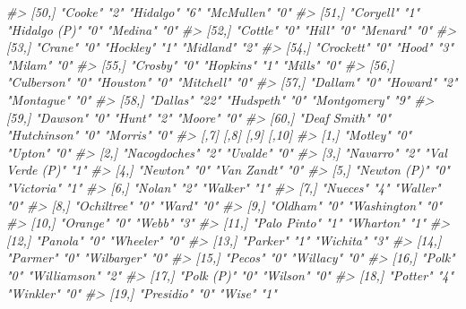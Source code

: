 \documentclass[
  12pt,
]{book}
\newenvironment{Shaded}{\begin{snugshade}}{\end{snugshade}}
\newcommand{\CommentTok}[1]{\textcolor[rgb]{0.37,0.37,0.37}{\textit{#1}}}
\begin{document}
\begin{Shaded}
\begin{Highlighting}[]
\CommentTok{\#\textgreater{} [50,] "Cooke"         "2"  "Hidalgo"     "6"  "McMullen"      "0" }
\CommentTok{\#\textgreater{} [51,] "Coryell"       "1"  "Hidalgo (P)" "0"  "Medina"        "0" }
\CommentTok{\#\textgreater{} [52,] "Cottle"        "0"  "Hill"        "0"  "Menard"        "0" }
\CommentTok{\#\textgreater{} [53,] "Crane"         "0"  "Hockley"     "1"  "Midland"       "2" }
\CommentTok{\#\textgreater{} [54,] "Crockett"      "0"  "Hood"        "3"  "Milam"         "0" }
\CommentTok{\#\textgreater{} [55,] "Crosby"        "0"  "Hopkins"     "1"  "Mills"         "0" }
\CommentTok{\#\textgreater{} [56,] "Culberson"     "0"  "Houston"     "0"  "Mitchell"      "0" }
\CommentTok{\#\textgreater{} [57,] "Dallam"        "0"  "Howard"      "2"  "Montague"      "0" }
\CommentTok{\#\textgreater{} [58,] "Dallas"        "22" "Hudspeth"    "0"  "Montgomery"    "9" }
\CommentTok{\#\textgreater{} [59,] "Dawson"        "0"  "Hunt"        "2"  "Moore"         "0" }
\CommentTok{\#\textgreater{} [60,] "Deaf Smith"    "0"  "Hutchinson"  "0"  "Morris"        "0" }
\CommentTok{\#\textgreater{}       [,7]            [,8] [,9]            [,10]}
\CommentTok{\#\textgreater{}  [1,] "Motley"        "0"  "Upton"         "0"  }
\CommentTok{\#\textgreater{}  [2,] "Nacogdoches"   "2"  "Uvalde"        "0"  }
\CommentTok{\#\textgreater{}  [3,] "Navarro"       "2"  "Val Verde (P)" "1"  }
\CommentTok{\#\textgreater{}  [4,] "Newton"        "0"  "Van Zandt"     "0"  }
\CommentTok{\#\textgreater{}  [5,] "Newton (P)"    "0"  "Victoria"      "1"  }
\CommentTok{\#\textgreater{}  [6,] "Nolan"         "2"  "Walker"        "1"  }
\CommentTok{\#\textgreater{}  [7,] "Nueces"        "4"  "Waller"        "0"  }
\CommentTok{\#\textgreater{}  [8,] "Ochiltree"     "0"  "Ward"          "0"  }
\CommentTok{\#\textgreater{}  [9,] "Oldham"        "0"  "Washington"    "0"  }
\CommentTok{\#\textgreater{} [10,] "Orange"        "0"  "Webb"          "3"  }
\CommentTok{\#\textgreater{} [11,] "Palo Pinto"    "1"  "Wharton"       "1"  }
\CommentTok{\#\textgreater{} [12,] "Panola"        "0"  "Wheeler"       "0"  }
\CommentTok{\#\textgreater{} [13,] "Parker"        "1"  "Wichita"       "3"  }
\CommentTok{\#\textgreater{} [14,] "Parmer"        "0"  "Wilbarger"     "0"  }
\CommentTok{\#\textgreater{} [15,] "Pecos"         "0"  "Willacy"       "0"  }
\CommentTok{\#\textgreater{} [16,] "Polk"          "0"  "Williamson"    "2"  }
\CommentTok{\#\textgreater{} [17,] "Polk (P)"      "0"  "Wilson"        "0"  }
\CommentTok{\#\textgreater{} [18,] "Potter"        "4"  "Winkler"       "0"  }
\CommentTok{\#\textgreater{} [19,] "Presidio"      "0"  "Wise"          "1"  }

\end{Highlighting}
\end{Shaded}
\end{document}
